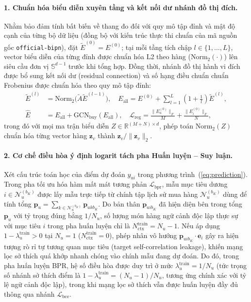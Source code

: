 \documentclass{llncs}
\begin{document}
\paragraph{1. Chuẩn hóa biểu diễn xuyên tầng và kết nối dư nhánh đồ thị đích.}
Nhằm bảo đảm tính bất biến về thang đo đối với quy mô tập đỉnh và mật độ cạnh của từng bộ dữ liệu (đồng bộ với kiến trúc thực thi chuẩn của mã nguồn gốc \texttt{official-bipn}), đặt $\tilde{E}^{(0)} = E^{(0)}$; tại mỗi tầng tích chập $l \in \{1, \dots, L\}$, vector biểu diễn của từng đỉnh được chuẩn hóa L2 theo hàng ($\mathrm{Norm}_2(\cdot)$) lên siêu cầu đơn vị $\mathbb{S}^{d-1}$ trước khi tổng hợp. Đồng thời, nhánh đồ thị hành vi đích được bổ sung kết nối dư (residual connection) và số hạng điều chuẩn chuẩn Frobenius được chuẩn hóa theo quy mô tập đỉnh:
\begin{align}
\tilde{E}^{(l)} &= \mathrm{Norm}_2\big(\tilde{A} \tilde{E}^{(l-1)}\big), \quad E_{\mathrm{all}} = E^{(0)} + \sum_{l=1}^L \left(1 + \frac{1}{l}\right)\tilde{E}^{(l)}, \label{eq:gcn_aligned} \\
\hat{E} &= E_{\mathrm{all}} + \mathrm{GCN}_{\mathrm{buy}}(E_{\mathrm{all}}), \quad \mathcal{L}_{\mathrm{reg}} = \frac{\lVert E_u^{(0)} \rVert_F}{M} + \frac{\lVert E_i^{(0)} \rVert_F}{N}, \label{eq:res_reg}
\end{align}
trong đó với mọi ma trận biểu diễn $Z \in \mathbb{R}^{(M+N)\times d}$, phép toán $\mathrm{Norm}_2(Z)$ chuẩn hóa từng vector hàng $\mathbf{z}_v$ thành $\mathbf{z}_v / \lVert \mathbf{z}_v \rVert_2$.

\paragraph{2. Cơ chế điều hòa ý định logarit tách pha Huấn luyện -- Suy luận.}
Xét cấu trúc toán học của điểm dự đoán $y_{ui}$ trong phương trình~(\ref{eq:prediction}). Trong pha tối ưu hóa hàm mất mát tương phản $\mathcal{L}_{\mathrm{bpr}}$, mẫu mục tiêu dương $i \in \mathcal{N}_u^{(b_K)}$ được lấy mẫu trực tiếp từ chính tập lịch sử mua hàng $\mathcal{N}_u^{(b_K)}$ dùng để tính tổng $\mathbf{p}_u = \sum_{k \in \mathcal{N}_u^{(b_K)}} \mathbf{p}_{uk b_K}$. Do bản thân $\mathbf{p}_{uib_K}$ đã hiện diện bên trong tổng $\mathbf{p}_u$ với tỷ trọng đúng bằng $1/N_u$, số lượng món hàng ngữ cảnh độc lập thực sự với mục tiêu $i$ trong pha huấn luyện chỉ là $N_{\mathrm{ctx}}^{\mathrm{train}} = N_u - 1$. Nếu áp dụng $1 - \lambda_u^{\mathrm{train}} > 0$ tại $N_u = 1$ ($N_{\mathrm{ctx}}^{\mathrm{train}} = 0$), phép nhân vô hướng $\mathbf{p}_{uib_K} \cdot \mathbf{e}_i$ gây ra hiện tượng rò rỉ tự tương quan mục tiêu (target self-correlation leakage), khiến mạng lọc sở thích quá khớp nhanh chóng vào chính mẫu đang dự đoán. Do đó, trong pha huấn luyện BPR, hệ số điều hòa được duy trì ở mức $\lambda_u^{\mathrm{train}} = 1 / N_u$ (tức trọng số nhánh sở thích điểm là $1 - \lambda_u^{\mathrm{train}} = (N_u - 1)/N_u$, tương ứng chính xác với tỷ lệ ngữ cảnh độc lập), trong khi mạng lọc sở thích vẫn được huấn luyện đầy đủ thông qua nhánh $\mathcal{L}_{\mathrm{bce}}$.
\end{document}
